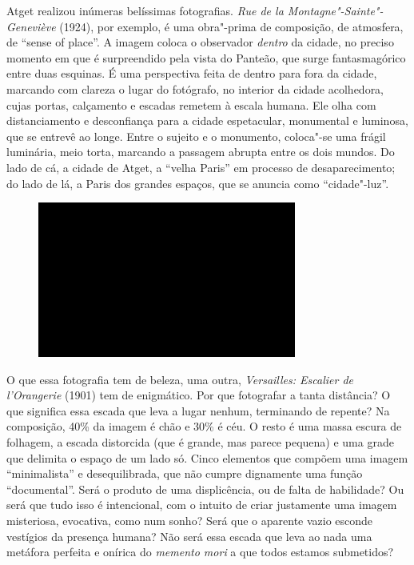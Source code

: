 Atget realizou inúmeras belíssimas fotografias. \emph{Rue de la
Montagne"-Sainte"-Geneviève} (1924), por exemplo, é uma obra"-prima de
composição, de atmosfera, de ``sense of place''. A imagem coloca o
observador \emph{dentro} da cidade, no preciso momento em que é
surpreendido pela vista do Panteão, que surge fantasmagórico entre duas
esquinas. É uma perspectiva feita de dentro para fora da cidade,
marcando com clareza o lugar do fotógrafo, no interior da cidade
acolhedora, cujas portas, calçamento e escadas remetem à escala humana.
Ele olha com distanciamento e desconfiança para a cidade espetacular,
monumental e luminosa, que se entrevê ao longe. Entre o sujeito e o
monumento, coloca"-se uma frágil luminária, meio torta, marcando a
passagem abrupta entre os dois mundos. Do lado de cá, a cidade de Atget,
a ``velha Paris'' em processo de desaparecimento; do lado de lá, a Paris
dos grandes espaços, que se anuncia como ``cidade"-luz''.

\begin{figure}[!ht]
\centering
 \includegraphics[width=85mm]{./imgs/im1.jpg}
\caption{\tiny{}}
\end{figure}

O que essa fotografia tem de beleza, uma outra, \emph{Versailles:
Escalier de l'Orangerie} (1901) tem de enigmático. Por que fotografar a
tanta distância? O que significa essa escada que leva a lugar nenhum,
terminando de repente? Na composição, 40\% da imagem é chão e 30\% é
céu. O resto é uma massa escura de folhagem, a escada distorcida (que é
grande, mas parece pequena) e uma grade que delimita o espaço de um lado
só. Cinco elementos que compõem uma imagem ``minimalista'' e
desequilibrada, que não cumpre dignamente uma função ``documental''.
Será o produto de uma displicência, ou de falta de habilidade? Ou será
que tudo isso é intencional, com o intuito de criar justamente uma
imagem misteriosa, evocativa, como num sonho? Será que o aparente vazio
esconde vestígios da presença humana? Não será essa escada que leva ao
nada uma metáfora perfeita e onírica do \emph{memento mori} a que todos
estamos submetidos?

